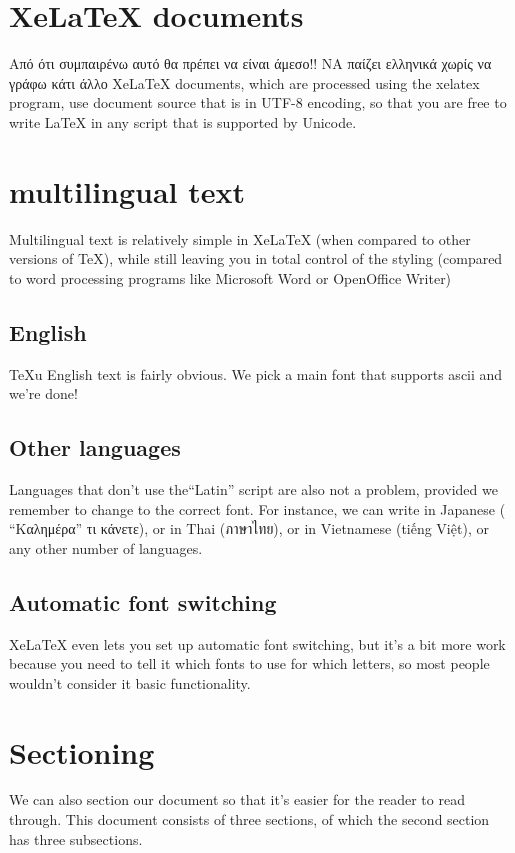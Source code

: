 \documentclass{article}
\begin{document}
\section{XeLaTeX documents}
Από ότι συμπαιρένω αυτό θα πρέπει να είναι άμεσο!!
ΝΑ παίζει ελληνικά χωρίς να γράφω κάτι άλλο
XeLaTeX documents, which are processed using the {\stressed xelatex} program, use
document source that is in {\stressed UTF-8} encoding, so that you are free to write
LaTeX
in any script that is supported by {\stressed Unicode}.

\section{multilingual text}

Multilingual text is relatively simple in XeLaTeX (when compared to other versions of
TeX), while still leaving you in total control of the styling (compared to word
processing programs like Microsoft Word or OpenOffice Writer)

\subsection{English}
TeXu
English text is fairly obvious. We pick a main font that supports ascii and we're done!

\subsection{Other languages}

Languages that don't use the``Latin'' script are also not a problem, provided we remember to change
to the correct {\stressed font}. For instance, we can write in Japanese (\exotic
{``Καλημέρα'' τι κάνετε}), or in
Thai ({\exotic ภาษาไทย}), or in Vietnamese ({\exotic tiếng Việt}), or any other number of languages.

\subsection{Automatic font switching}

XeLaTeX even lets you set up automatic font switching, but it's a bit more work because you need
to tell it which fonts to use for which letters, so most people wouldn't consider it basic functionality.

\section{Sectioning}

We can also section our document so that it's easier for the reader to read through. This document
consists of three sections, of which the second section has three subsections.
\end{document}
